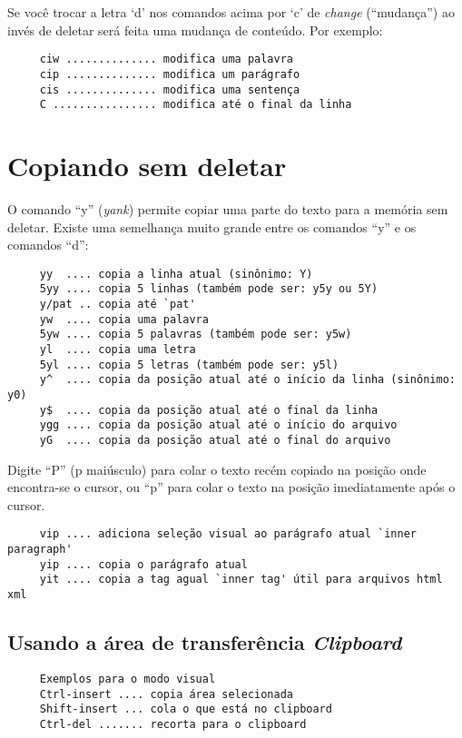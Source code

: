Se você trocar a letra `d' nos comandos acima por `c' de {\em change}
(``mudança'') ao invés de deletar será feita uma mudança de conteúdo.  Por
exemplo:

\begin{verbatim}
     ciw .............. modifica uma palavra
     cip .............. modifica um parágrafo
     cis .............. modifica uma sentença
     C ................ modifica até o final da linha
\end{verbatim}

\section{Copiando sem deletar}\label{Copiando sem deletar}

O comando ``y'' ({\em yank}) permite copiar uma parte do texto para a memória sem deletar.
Existe uma semelhança muito grande entre os comandos ``y'' e os comandos ``d'':

\begin{verbatim}
     yy  .... copia a linha atual (sinônimo: Y)
     5yy .... copia 5 linhas (também pode ser: y5y ou 5Y)
     y/pat .. copia até `pat'
     yw  .... copia uma palavra
     5yw .... copia 5 palavras (também pode ser: y5w)
     yl  .... copia uma letra
     5yl .... copia 5 letras (também pode ser: y5l)
     y^  .... copia da posição atual até o início da linha (sinônimo: y0)
     y$  .... copia da posição atual até o final da linha
     ygg .... copia da posição atual até o início do arquivo
     yG  .... copia da posição atual até o final do arquivo
\end{verbatim}

Digite ``P'' (p maiúsculo) para colar o texto recém copiado na posição onde
encontra-se o cursor, ou ``p'' para colar o texto na posição imediatamente
após o cursor.

\begin{verbatim}
     vip .... adiciona seleção visual ao parágrafo atual `inner paragraph'
     yip .... copia o parágrafo atual
     yit .... copia a tag agual `inner tag' útil para arquivos html xml
\end{verbatim}

\subsection{Usando a área de transferência {\em Clipboard}}

\begin{verbatim}
     Exemplos para o modo visual
     Ctrl-insert .... copia área selecionada 
     Shift-insert ... cola o que está no clipboard
     Ctrl-del ....... recorta para o clipboard
\end{verbatim}

